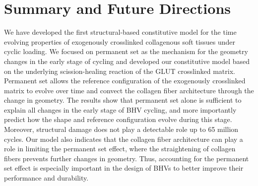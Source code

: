 

\section{Summary and Future Directions}
	We have developed the first structural-based constitutive model for the time evolving properties of exogenously crosslinked collagenous soft tissues under cyclic loading. We focused on permanent set as the mechanism for the geometry changes in the early stage of cycling and developed our constitutive model based on the underlying scission-healing reaction of the GLUT crosslinked matrix. Permanent set allows the reference configuration of the exogenously crosslinked matrix to evolve over time and convect the collagen fiber architecture through the change in geometry. The results show that permanent set alone is sufficient to explain all changes in the early stage of BHV cycling, and more importantly predict how the shape and reference configuration evolve during this stage. 	Moreover, structural damage does not play a detectable role up to 65 million cycles. Our model also indicates that the collagen fiber architecture can play a role in limiting the permanent set effect, where the straightening of collagen fibers prevents further changes in geometry. Thus, accounting for the permanent set effect is especially important in the design of BHVs to better improve their performance and durability. 
	
